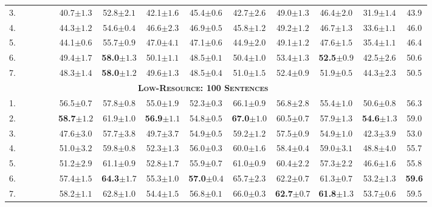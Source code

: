 \documentclass[11pt,a4paper]{article}
\newcommand{\cmark}{\textcolor{blue}{\ding{51}}}
\newcommand{\xmark}{\textcolor{red}{\ding{55}}}
\begin{document}
\begin{table*}[t]
\begin{tabular}{l|cccc||cccccccc|c}
3. & \cmark & \xmark & \xmark & \xmark & 40.7$\pm1.3$ & 52.8$\pm2.1$ & 42.1$\pm1.6$ & 45.4$\pm0.6$ & 42.7$\pm2.6$ & 49.0$\pm1.3$ & 46.4$\pm2.0$ & 31.9$\pm1.4$ & 43.9 \\
4. & \cmark & \xmark & \cmark & \xmark & 44.3$\pm1.2$ & 54.6$\pm0.4$ & 46.6$\pm2.3$ & 46.9$\pm0.5$ & 45.8$\pm1.2$ & 49.2$\pm1.2$ & 46.7$\pm1.3$ & 33.6$\pm1.1$ & 46.0 \\
5. & \cmark & \xmark & \cmark & \cmark & 44.1$\pm0.6$ & 55.7$\pm0.9$ & 47.0$\pm4.1$ & 47.1$\pm0.6$ & 44.9$\pm2.0$ & 49.1$\pm1.2$ & 47.6$\pm1.5$ & 35.4$\pm1.1$ & 46.4 \\
6. & \cmark & \cmark & \cmark & \xmark & 49.4$\pm1.7$ & \textbf{58.0}$\pm1.3$ & 50.1$\pm1.1$ & 48.5$\pm0.1$ & 50.4$\pm1.0$ & 53.4$\pm1.3$ & \textbf{52.5}$\pm0.9$ & 42.5$\pm2.6$ & 50.6 \\
7. & \cmark & \cmark & \cmark & \cmark & 48.3$\pm1.4$ & \textbf{58.0}$\pm1.2$ & 49.6$\pm1.3$ & 48.5$\pm0.4$ & 51.0$\pm1.5$ & 52.4$\pm0.9$ & 51.9$\pm0.5$ & 44.3$\pm2.3$ & 50.5 \\
\hline\hline
\multicolumn{13}{c}{\bf \textsc{Low-Resource: 100 Sentences}}\\
\hline
1. & \xmark & \cmark & \xmark & \xmark & 56.5$\pm0.7$ & 57.8$\pm0.8$ & 55.0$\pm1.9$ & 52.3$\pm0.3$ & 66.1$\pm0.9$ & 56.8$\pm2.8$ & 55.4$\pm1.0$ & 50.6$\pm0.8$ & 56.3 \\
2. & \xmark & \cmark & \cmark & \xmark & \textbf{58.7}$\pm1.2$ & 61.9$\pm1.0$ & \textbf{56.9}$\pm1.1$ & 54.8$\pm0.5$ & \textbf{67.0}$\pm1.0$ & 60.5$\pm0.7$ & 57.9$\pm1.3$ & \textbf{54.6}$\pm1.3$ & 59.0 \\
3. & \cmark & \xmark & \xmark & \xmark & 47.6$\pm3.0$ & 57.7$\pm3.8$ & 49.7$\pm3.7$ & 54.9$\pm0.5$ & 59.2$\pm1.2$ & 57.5$\pm0.9$ & 54.9$\pm1.0$ & 42.3$\pm3.9$ & 53.0 \\
4. & \cmark & \xmark & \cmark & \xmark & 51.0$\pm3.2$ & 59.8$\pm0.8$ & 52.3$\pm1.3$ & 56.0$\pm0.3$ & 60.0$\pm1.6$ & 58.4$\pm0.4$ & 59.0$\pm3.1$ & 48.8$\pm4.0$ & 55.7 \\
5. & \cmark & \xmark & \cmark & \cmark & 51.2$\pm2.9$ & 61.1$\pm0.9$ & 52.8$\pm1.7$ & 55.9$\pm0.7$ & 61.0$\pm0.9$ & 60.4$\pm2.2$ & 57.3$\pm2.2$ & 46.6$\pm1.6$ & 55.8 \\
6. & \cmark & \cmark & \cmark & \xmark & 57.4$\pm1.5$ & \textbf{64.3}$\pm1.7$ & 55.3$\pm1.0$ & \textbf{57.0}$\pm0.4$ & 65.7$\pm2.3$ & 62.2$\pm0.7$ & 61.3$\pm0.7$ & 53.2$\pm1.3$ & \textbf{59.6} \\
7. & \cmark & \cmark & \cmark & \cmark & 58.2$\pm1.1$ & 62.8$\pm1.0$ & 54.4$\pm1.5$ & 56.8$\pm0.1$ & 66.0$\pm0.3$ & \textbf{62.7}$\pm0.7$ & \textbf{61.8}$\pm1.3$ & 53.7$\pm0.6$ & 59.5 \\

\end{tabular}
\end{table*}
\end{document}
